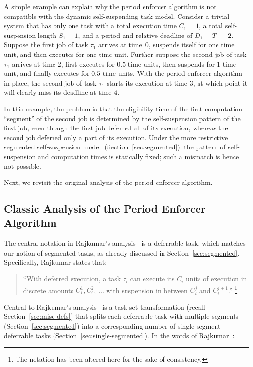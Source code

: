 A simple example can explain why the period enforcer algorithm is not compatible with the dynamic self-suspending task model. Consider a trivial system that has only one task with a total execution time $C_1=1$, a total self-suspension length $S_1=1$, and a period and relative deadline of $D_1=T_1=2$. Suppose the first job of task $\tau_1$ arrives at time~$0$, suspends itself for one time unit, and then executes for one time unit. Further suppose the second job of task $\tau_1$ arrives at time $2$, first executes for $0.5$ time units, then suspends for $1$ time unit, and finally executes for $0.5$ time units. With the period enforcer algorithm in place, the second job of task $\tau_1$ starts its execution at time $3$, at which point it will clearly miss its deadline at time $4$.

In this example, the problem is that the eligibility time of the first computation ``segment'' of the second job is determined by the self-suspension pattern of the first job, even though the first job deferred all of its execution, whereas the second job deferred only a part of its execution. Under the more restrictive segmented self-suspension model~(Section~\ref{sec:segmented}), the pattern of self-suspension and computation times is statically fixed; such a mismatch is hence not possible.

Next, we revisit the original analysis of the period enforcer algorithm.


\subsection{Classic Analysis of the Period Enforcer Algorithm}
\label{sec:classic-analysis}

The central notation in Rajkumar's analysis~\cite{Raj:suspension1991} is a deferrable task, which matches our notion of segmented tasks, as already discussed in Section~\ref{sec:segmented}.  Specifically, Rajkumar states that:
\begin{quote}
``With deferred execution, a task $\tau_i$ can execute its $C_i$ units of execution in discrete amounts $C_i^1, C_i^2$, $\ldots$ with suspension in between $C_i^j$ and $C_i^{j+1}$.'' \cite[Section 3]{Raj:suspension1991}\footnote{The notation has been altered here for the sake of consistency. } 
\end{quote}


Central to Rajkumar's analysis~\cite{Raj:suspension1991} is a task set transformation (recall Section~\ref{sec:misc-defs}) that splits each deferrable task with multiple segments (Section~\ref{sec:segmented}) into a corresponding number of single-segment deferrable tasks (Section~\ref{sec:single-segmented}).  In the words of Rajkumar~\cite[Section 3]{Raj:suspension1991}:

